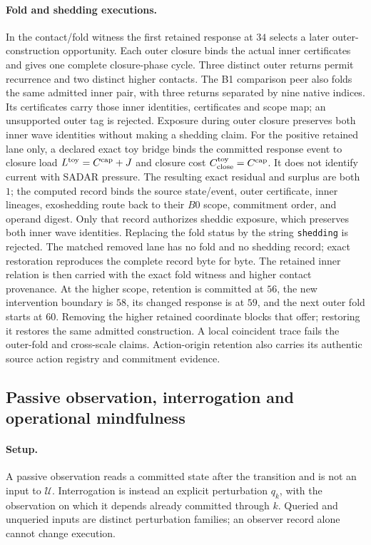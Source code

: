 \paragraph{Fold and shedding executions.}
In the contact/fold witness the first retained response at \(34\) selects a
later outer-construction opportunity. Each outer closure binds the actual
inner certificates and gives one complete closure-phase cycle. Three distinct outer returns permit
recurrence and two distinct higher contacts. The B1 comparison peer also
folds the same admitted inner pair, with three returns separated by nine
native indices. Its certificates carry those inner identities, certificates
and scope map; an unsupported outer tag is rejected. Exposure during outer
closure preserves both inner wave identities without making a shedding claim.
For the positive retained lane only, a declared exact toy bridge binds the
committed response event to closure load
\(L^{\rm toy}=C^{\rm cap}+J\) and closure cost
\(C_{\rm close}^{\rm toy}=C^{\rm cap}\). It does not identify current with
SADAR pressure. The resulting exact residual and surplus are both \(1\); the
computed record binds the source state/event, outer certificate, inner
lineages, exoshedding route back to their \(B0\) scope, commitment order, and
operand digest. Only that record authorizes sheddic exposure, which preserves
both inner wave identities. Replacing the fold status by the string
\texttt{shedding} is rejected. The matched removed lane has no fold and no
shedding record; exact restoration reproduces the complete record byte for
byte. The retained inner relation is then carried with the exact fold witness
and higher contact provenance.
At the higher scope, retention is committed at \(56\), the new intervention
boundary is \(58\), its changed response is at \(59\), and the next outer fold
starts at \(60\). Removing the higher retained coordinate blocks that offer;
restoring it restores the same admitted construction. A local coincident
trace fails the outer-fold and cross-scale claims. Action-origin retention
also carries its authentic source action registry and commitment evidence.

\subsection{Passive observation, interrogation and operational mindfulness}
\label{subsec:query-mindfulness}
\paragraph{Setup.}
A passive observation reads a committed state after the transition and is
not an input to \(\mathcal U\). Interrogation is instead an explicit
perturbation \(q_k\), with the observation on which it depends already
committed through \(k\). Queried and unqueried inputs are distinct
perturbation families; an observer record alone cannot change execution.

